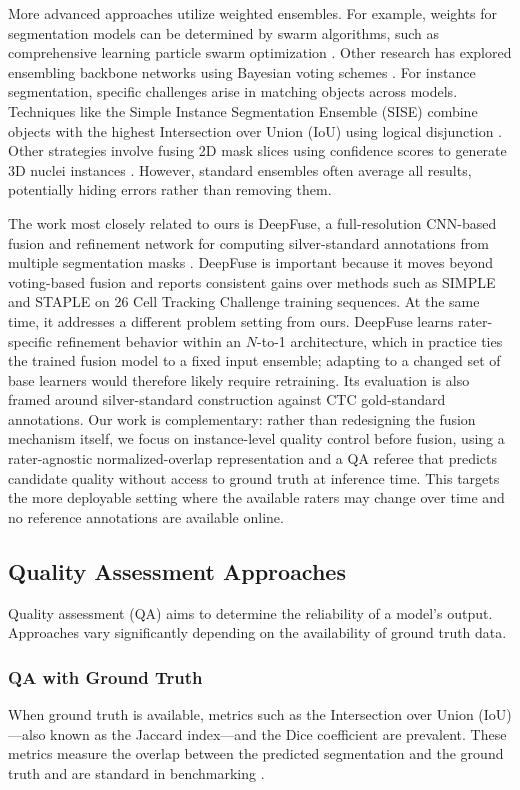 More advanced approaches utilize weighted ensembles. For example, weights for segmentation models
can be determined by swarm algorithms, such as comprehensive learning particle swarm optimization
\cite{dang2021weighted}. Other research has explored ensembling backbone networks using Bayesian
voting schemes \cite{catalano2024more}. For instance segmentation, specific challenges arise in
matching objects across models. Techniques like the Simple Instance Segmentation Ensemble (SISE)
combine objects with the highest Intersection over Union (IoU) using logical disjunction
\cite{cerpa2021ensemble}. Other strategies involve fusing 2D mask slices using confidence scores to
generate 3D nuclei instances \cite{wu2022ensemble}. However, standard ensembles often average all
results, potentially hiding errors rather than removing them.

The work most closely related to ours is DeepFuse, a full-resolution CNN-based fusion and
refinement network for computing silver-standard annotations from multiple segmentation masks
\cite{akbas2025deepfuse}. DeepFuse is important because it moves beyond voting-based fusion and
reports consistent gains over methods such as SIMPLE and STAPLE on 26 Cell Tracking Challenge
training sequences. At the same time, it addresses a different problem setting from ours. DeepFuse
learns rater-specific refinement behavior within an $N$-to-1 architecture, which in practice ties
the trained fusion model to a fixed input ensemble; adapting to a changed set of base learners
would therefore likely require retraining. Its evaluation is also framed around silver-standard
construction against CTC gold-standard annotations. Our work is complementary: rather than
redesigning the fusion mechanism itself, we focus on instance-level quality control before fusion,
using a rater-agnostic normalized-overlap representation and a QA referee that predicts candidate
quality without access to ground truth at inference time. This targets the more deployable setting
where the available raters may change over time and no reference annotations are available online.

\subsection{Quality Assessment Approaches}
Quality assessment (QA) aims to determine the reliability of a model's output. Approaches vary
significantly depending on the availability of ground truth data.

\subsubsection{QA with Ground Truth}
When ground truth is available, metrics such as the Intersection over Union (IoU)—also known as
the Jaccard index—and the Dice coefficient are prevalent. These metrics measure the overlap
between the predicted segmentation and the ground truth and are standard in benchmarking
\cite{mavska2023cell}.

